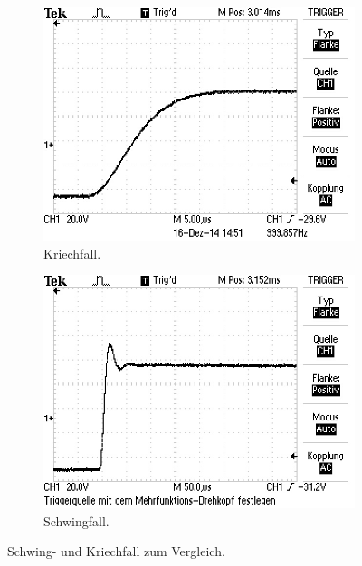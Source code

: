 \begin{figure}[hbp]
	\centering
	\begin{subfigure}{0.4\textwidth}
		\includegraphics[width=\textwidth]{Bilder/Kriechfall1.JPG}
		\caption{Kriechfall.}
	\end{subfigure}
	\begin{subfigure}{0.4\textwidth}
		\includegraphics[width=\textwidth]{Bilder/Schwingfall.JPG}
		\caption{Schwingfall.}
	\end{subfigure}
	\caption{Schwing- und Kriechfall zum Vergleich.}
	\label{fig:faelle}
\end{figure}

